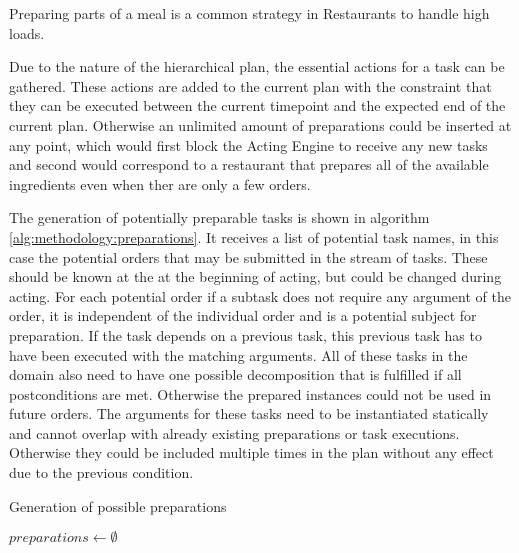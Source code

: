 Preparing parts of a meal is a common strategy in Restaurants to handle high loads.

Due to the nature of the hierarchical plan, the essential actions for a task can be gathered.
These actions are added to the current plan with the constraint that they can be executed between the current timepoint and the expected end of the current plan.
Otherwise an unlimited amount of preparations could be inserted at any point, which would first block the Acting Engine to receive any new tasks and second would correspond to a restaurant that prepares all of the available ingredients even when ther are only a few orders.

The generation of potentially preparable tasks is shown in algorithm \ref{alg:methodology:preparations}.
It receives a list of potential task names, in this case the potential orders that may be submitted in the stream of tasks.
These should be known at the at the beginning of acting, but could be changed during acting.
For each potential order if a subtask does not require any argument of the order, it is independent of the individual order and is a potential subject for preparation.
If the task depends on a previous task, this previous task has to have been executed with the matching arguments.
All of these tasks in the domain also need to have one possible decomposition that is fulfilled if all postconditions are met.
Otherwise the prepared instances could not be used in future orders.
The arguments for these tasks need to be instantiated statically and cannot overlap with already existing preparations or task executions.
Otherwise they could be included multiple times in the plan without any effect due to the previous condition.


\begin{algorithm}
    \caption{Generation of possible preparations}
    \label{alg:methodology:preparations}
    $preparations \leftarrow \emptyset$\;
\end{algorithm}

